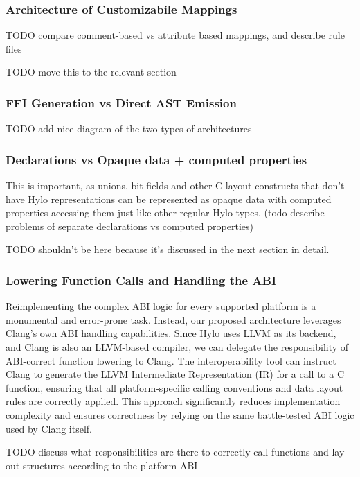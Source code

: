 \subsubsection{Architecture of Customizabile Mappings}
TODO compare comment-based vs attribute based mappings, and describe rule files

TODO move this to the relevant section

\subsubsection{FFI Generation vs Direct AST Emission}
TODO add nice diagram of the two types of architectures


\subsubsection{Declarations vs Opaque data + computed properties}
This is important, as unions, bit-fields and other C layout constructs that don't have Hylo representations can be represented as opaque data with computed properties accessing them just like other regular Hylo types. (todo describe problems of separate declarations vs computed properties)

TODO shouldn't be here because it's discussed in the next section in detail.

\subsubsection{Lowering Function Calls and Handling the ABI}

Reimplementing the complex ABI logic for every supported platform is a monumental and error-prone task. Instead, our proposed architecture leverages Clang's own ABI handling capabilities. Since Hylo uses LLVM as its backend, and Clang is also an LLVM-based compiler, we can delegate the responsibility of ABI-correct function lowering to Clang. The interoperability tool can instruct Clang to generate the LLVM Intermediate Representation (IR) for a call to a C function, ensuring that all platform-specific calling conventions and data layout rules are correctly applied. This approach significantly reduces implementation complexity and ensures correctness by relying on the same battle-tested ABI logic used by Clang itself.

TODO discuss what responsibilities are there to correctly call functions and lay out structures according to the platform ABI

